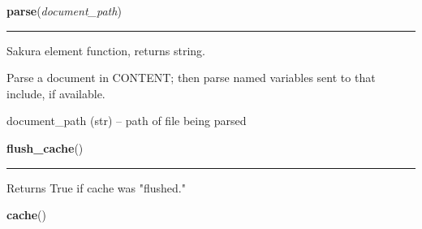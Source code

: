     \label{sakura:parse}

    \vspace{0.5ex}

\hspace{.8\funcindent}\begin{boxedminipage}{\funcwidth}

    \raggedright \textbf{parse}(\textit{document\_path})

    \vspace{-1.5ex}

    \rule{\textwidth}{0.5\fboxrule}
\setlength{\parskip}{2ex}
    Sakura element function, returns string.

    Parse a document in CONTENT; then parse named variables sent to that 
    include, if available.

    document\_path (str) -- path of file being parsed

\setlength{\parskip}{1ex}
    \end{boxedminipage}

    \label{sakura:flush_cache}

    \vspace{0.5ex}

\hspace{.8\funcindent}\begin{boxedminipage}{\funcwidth}

    \raggedright \textbf{flush\_cache}()

    \vspace{-1.5ex}

    \rule{\textwidth}{0.5\fboxrule}
\setlength{\parskip}{2ex}
    Returns True if cache was "flushed."

\setlength{\parskip}{1ex}
    \end{boxedminipage}

    \label{sakura:cache}

    \vspace{0.5ex}

\hspace{.8\funcindent}\begin{boxedminipage}{\funcwidth}

    \raggedright \textbf{cache}()

\setlength{\parskip}{2ex}
\setlength{\parskip}{1ex}
    \end{boxedminipage}

